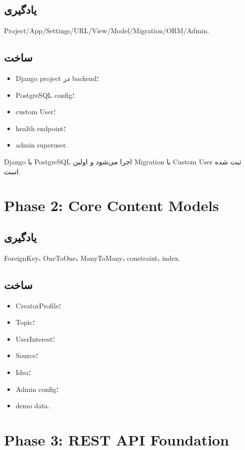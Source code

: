 \subsection*{یادگیری}
Project/App/Settings/URL/View/Model/Migration/ORM/Admin.

\subsection*{ساخت}
\begin{itemize}
  \item Django project در backend؛
  \item PostgreSQL config؛
  \item custom User؛
  \item health endpoint؛
  \item admin superuser.
\end{itemize}

\begin{donebox}
Django با PostgreSQL اجرا می‌شود و اولین Migration با Custom User ثبت شده است.
\end{donebox}

\section{Phase 2: Core Content Models}

\subsection*{یادگیری}
ForeignKey، OneToOne، ManyToMany، constraint، index.

\subsection*{ساخت}
\begin{itemize}
  \item CreatorProfile؛
  \item Topic؛
  \item UserInterest؛
  \item Source؛
  \item Idea؛
  \item Admin config؛
  \item demo data.
\end{itemize}

\section{Phase 3: REST API Foundation}

